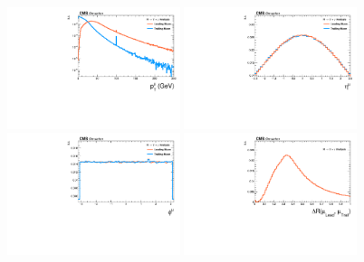\begin{figure}[!htbp]
\begin{center}
\includegraphics[width=0.45\textwidth]{figures_and_tables/outputPlots/HtoUpsilon_Cat0_ZZZZZ/mc/unpolarized/h_Gen_Mu_pt}%
\includegraphics[width=0.45\textwidth]{figures_and_tables/outputPlots/HtoUpsilon_Cat0_ZZZZZ/mc/unpolarized/h_Gen_Mu_eta}
\includegraphics[width=0.45\textwidth]{figures_and_tables/outputPlots/HtoUpsilon_Cat0_ZZZZZ/mc/unpolarized/h_Gen_Mu_phi}
\includegraphics[width=0.45\textwidth]{figures_and_tables/outputPlots/HtoUpsilon_Cat0_ZZZZZ/mc/unpolarized/h_Gen_deltaR_Leading_Trailing}

\end{center}
\end{figure}
